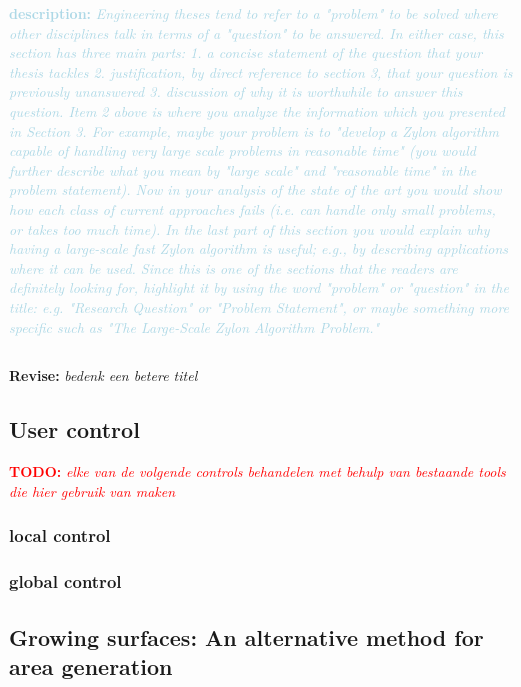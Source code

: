 \documentclass{article}
\newcommand{\todo}[1]{\textcolor{red}{\textbf{\newline TODO: }\it{#1} \newline}}
\newcommand{\revise}[1]{\textcolor{myOrange}{\textbf{\newline Revise: }\it{#1}}}
\newcommand{\desc}[1]{\textcolor{lightblue}{\textbf{\newline description: }\it{#1} \newline}}
\begin{document}
\desc{
Engineering theses tend to refer to a "problem" to be solved where other disciplines talk in terms of a "question" to be answered. In either case, this section has three main parts:
1. a concise statement of the question that your thesis tackles
2. justification, by direct reference to section 3, that your question is previously unanswered
3. discussion of why it is worthwhile to answer this question.
Item 2 above is where you analyze the information which you presented in Section 3. For example, maybe your problem is to "develop a Zylon algorithm capable of handling very large scale problems in reasonable time" (you would further describe what you mean by "large scale" and "reasonable time" in the problem statement). Now in your analysis of the state of the art you would show how each class of current approaches fails (i.e. can handle only small problems, or takes too much time). In the last part of this section you would explain why having a large-scale fast Zylon algorithm is useful; e.g., by describing applications where it can be used.
Since this is one of the sections that the readers are definitely looking for, highlight it by using the word "problem" or "question" in the title: e.g. "Research Question" or "Problem Statement", or maybe something more specific such as "The Large-Scale Zylon Algorithm Problem." 
}

\subsection{} 
\revise{bedenk een betere titel}

\subsection{User control} 

\todo{elke van de volgende controls behandelen met behulp van bestaande tools die hier gebruik van maken}


\subsubsection{local control}


\subsubsection{global control}


\subsection{Growing surfaces: An alternative method for area generation}
\end{document}
